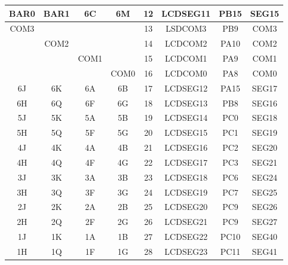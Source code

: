 \begin{table}[H]
\begin{center}
\begin{tabular}{|c|c|c|c|c|c|c|c|}
BAR0          & BAR1          & 6C            & 6M            & 12           & LCDSEG11      & PB15              & SEG15             \\ \hline
COM3          &               &               &               & 13           & LSDCOM3       & PB9               & COM3              \\ \hline
              & COM2          &               &               & 14           & LCDCOM2       & PA10              & COM2              \\ \hline
              &               & COM1          &               & 15           & LCDCOM1       & PA9               & COM1              \\ \hline
              &               &               & COM0          & 16           & LCDCOM0       & PA8               & COM0              \\ \hline
6J            & 6K            & 6A            & 6B            & 17           & LCDSEG12      & PA15              & SEG17             \\ \hline
6H            & 6Q            & 6F            & 6G            & 18           & LCDSEG13      & PB8               & SEG16             \\ \hline
5J            & 5K            & 5A            & 5B            & 19           & LCDSEG14      & PC0               & SEG18             \\ \hline
5H            & 5Q            & 5F            & 5G            & 20           & LCDSEG15      & PC1               & SEG19             \\ \hline
4J            & 4K            & 4A            & 4B            & 21           & LCDSEG16      & PC2               & SEG20             \\ \hline
4H            & 4Q            & 4F            & 4G            & 22           & LCDSEG17      & PC3               & SEG21             \\ \hline
3J            & 3K            & 3A            & 3B            & 23           & LCDSEG18      & PC6               & SEG24             \\ \hline
3H            & 3Q            & 3F            & 3G            & 24           & LCDSEG19      & PC7               & SEG25             \\ \hline
2J            & 2K            & 2A            & 2B            & 25           & LCDSEG20      & PC9               & SEG26             \\ \hline
2H            & 2Q            & 2F            & 2G            & 26           & LCDSEG21      & PC9               & SEG27             \\ \hline
1J            & 1K            & 1A            & 1B            & 27           & LCDSEG22      & PC10              & SEG40             \\ \hline
1H            & 1Q            & 1F            & 1G            & 28           & LCDSEG23      & PC11              & SEG41             \\ \hline


\end{tabular}
\end{center}
\end{table}
